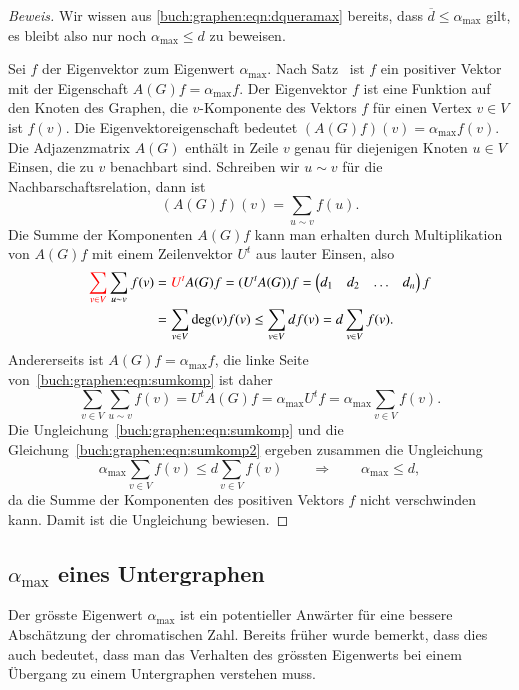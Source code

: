 \begin{proof}[Beweis]
Wir wissen aus \eqref{buch:graphen:eqn:dqueramax} bereits, dass
$\overline{d}\le\alpha_{\text{max}}$ gilt, es bleibt also nur noch
$\alpha_{\text{max}}\le d$ zu beweisen.

Sei $f$ der Eigenvektor zum Eigenwert $\alpha_{\text{max}}$.
Nach Satz~\label{buch:wahrscheinlichkeit:satz:perron-frobenius2}
ist $f$ ein positiver Vektor mit der Eigenschaft $A(G)f=\alpha_{\text{max}}f$.
Der Eigenvektor $f$ ist eine Funktion auf den Knoten des Graphen,
die $v$-Komponente des Vektors $f$ für einen Vertex $v\in V$ ist $f(v)$.
Die Eigenvektoreigenschaft bedeutet $(A(G)f)(v)=\alpha_{\text{max}} f(v)$.
Die Adjazenzmatrix $A(G)$ enthält in Zeile $v$ genau für diejenigen
Knoten $u\in V$ Einsen, die zu $v$ benachbart sind.
Schreiben wir $u\sim v$ für die Nachbarschaftsrelation, dann ist 
\[
(A(G)f)(v)
=
\sum_{u\sim v} f(u).
\]
Die Summe der Komponenten $A(G)f$ kann man erhalten durch Multiplikation
von $A(G)f$ mit einem Zeilenvektor $U^t$ aus lauter Einsen, also
\begin{equation}
\begin{aligned}
{\color{red}
\sum_{v\in V}}\sum_{u\sim v}f(v)
&=
{\color{red}U^t}A(G)f
=
(U^tA(G))f
=
\begin{pmatrix}d_1&d_2&\dots&d_n\end{pmatrix} f
\\
&=
\sum_{v\in V}\deg (v) f(v)
\le
\sum_{v\in V}df(v)
=
d
\sum_{v\in V}f(v).
\end{aligned}
\label{buch:graphen:eqn:sumkomp}
\end{equation}
Andererseits ist $A(G)f=\alpha_{\text{max}}f$, die linke Seite
von~\eqref{buch:graphen:eqn:sumkomp} ist daher
\begin{equation}
\sum_{v\in V}\sum_{u\sim v}f(v)
=
U^tA(G)f
=
\alpha_{\text{max}}
U^tf
=
\alpha_{\text{max}} \sum_{v\in V}f(v).
\label{buch:graphen:eqn:sumkomp2}
\end{equation}
Die Ungleichung~\eqref{buch:graphen:eqn:sumkomp}
und die Gleichung~\eqref{buch:graphen:eqn:sumkomp2} ergeben zusammen
die Ungleichung
\[
\alpha_{\text{max}} \sum_{v\in V}f(v)
\le d\sum_{v\in V}f(v)
\qquad\Rightarrow\qquad
\alpha_{\text{max}} \le d,
\]
da die Summe der Komponenten des positiven Vektors $f$ nicht verschwinden
kann.
Damit ist die Ungleichung bewiesen.
\end{proof}

%
%
\subsection{$\alpha_{\text{max}}$ eines Untergraphen
\label{buch:subsection:alphamax-eines-untergraphen}}
Der grösste Eigenwert $\alpha_{\text{max}}$ ist ein potentieller 
Anwärter für eine bessere Abschätzung der chromatischen Zahl.
Bereits früher wurde bemerkt, dass dies auch bedeutet, dass man 
das Verhalten des grössten Eigenwerts bei einem Übergang zu einem
Untergraphen verstehen muss.

